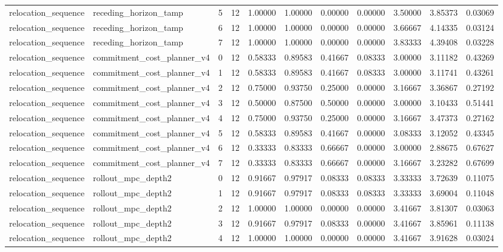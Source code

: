 \documentclass{article}
\begin{document}
\begin{table}[tbp]
{\begin{tabular}{lllllllllll}
relocation\_sequence & receding\_horizon\_tamp & 5 & 12 & 1.00000 & 1.00000 & 0.00000 & 0.00000 & 3.50000 & 3.85373 & 0.03069 \\
relocation\_sequence & receding\_horizon\_tamp & 6 & 12 & 1.00000 & 1.00000 & 0.00000 & 0.00000 & 3.66667 & 4.14335 & 0.03124 \\
relocation\_sequence & receding\_horizon\_tamp & 7 & 12 & 1.00000 & 1.00000 & 0.00000 & 0.00000 & 3.83333 & 4.39408 & 0.03228 \\
relocation\_sequence & commitment\_cost\_planner\_v4 & 0 & 12 & 0.58333 & 0.89583 & 0.41667 & 0.08333 & 3.00000 & 3.11182 & 0.43269 \\
relocation\_sequence & commitment\_cost\_planner\_v4 & 1 & 12 & 0.58333 & 0.89583 & 0.41667 & 0.08333 & 3.00000 & 3.11741 & 0.43261 \\
relocation\_sequence & commitment\_cost\_planner\_v4 & 2 & 12 & 0.75000 & 0.93750 & 0.25000 & 0.00000 & 3.16667 & 3.36867 & 0.27192 \\
relocation\_sequence & commitment\_cost\_planner\_v4 & 3 & 12 & 0.50000 & 0.87500 & 0.50000 & 0.00000 & 3.00000 & 3.10433 & 0.51441 \\
relocation\_sequence & commitment\_cost\_planner\_v4 & 4 & 12 & 0.75000 & 0.93750 & 0.25000 & 0.00000 & 3.16667 & 3.47373 & 0.27162 \\
relocation\_sequence & commitment\_cost\_planner\_v4 & 5 & 12 & 0.58333 & 0.89583 & 0.41667 & 0.00000 & 3.08333 & 3.12052 & 0.43345 \\
relocation\_sequence & commitment\_cost\_planner\_v4 & 6 & 12 & 0.33333 & 0.83333 & 0.66667 & 0.00000 & 3.00000 & 2.88675 & 0.67627 \\
relocation\_sequence & commitment\_cost\_planner\_v4 & 7 & 12 & 0.33333 & 0.83333 & 0.66667 & 0.00000 & 3.16667 & 3.23282 & 0.67699 \\
relocation\_sequence & rollout\_mpc\_depth2 & 0 & 12 & 0.91667 & 0.97917 & 0.08333 & 0.08333 & 3.33333 & 3.72639 & 0.11075 \\
relocation\_sequence & rollout\_mpc\_depth2 & 1 & 12 & 0.91667 & 0.97917 & 0.08333 & 0.08333 & 3.33333 & 3.69004 & 0.11048 \\
relocation\_sequence & rollout\_mpc\_depth2 & 2 & 12 & 1.00000 & 1.00000 & 0.00000 & 0.00000 & 3.41667 & 3.81307 & 0.03063 \\
relocation\_sequence & rollout\_mpc\_depth2 & 3 & 12 & 0.91667 & 0.97917 & 0.08333 & 0.00000 & 3.41667 & 3.85961 & 0.11138 \\
relocation\_sequence & rollout\_mpc\_depth2 & 4 & 12 & 1.00000 & 1.00000 & 0.00000 & 0.00000 & 3.41667 & 3.91628 & 0.03024 \\

\end{tabular}}
\end{table}
\end{document}
